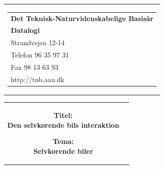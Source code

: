\documentclass[12pt,hidelinks]{article}
\begin{document}
	\begin{titlepage}
	\begin{nopagebreak}
	{\small\samepage 
	\hfill\begin{tabular}{r}
	\parbox{6cm}{  
	\hfill \parbox{4.9cm}{\begin{tabular}{l}
	{\sf\small \textbf{Det Teknisk-Naturvidenskabelige Basis{\aa}r }}\\
	{\sf\small  \textbf{Datalogi}} \\
	{\sf\small Strandvejen 12-14} \\
	{\sf\small Telefon 96 35 97 31} \\
	{\sf\small Fax 98 13 63 93} \\
	{\sf\small http://tnb.aau.dk}
	\end{tabular}}}
	\\
	\end{tabular}

	\begin{tabular}{cc}
	\parbox{7cm}{
	\begin{description}

	\item {\bf Titel: \\Den selvkørende bils interaktion} 
	  
	\item {\bf Tema: \\Selvkørende biler} 

	\end{description}

	\parbox{7cm}{

}}
\end{tabular}}
\end{nopagebreak}
\end{titlepage}
\end{document}
